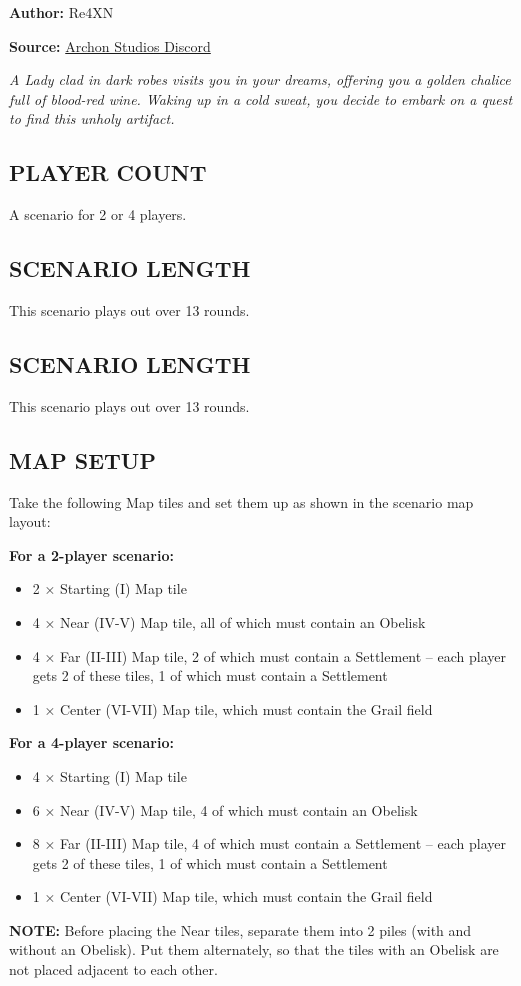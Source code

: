 
\begin{multicols*}{2}

\textbf{Author:} Re4XN

\textbf{Source:} \href{https://discord.com/channels/740870068178649108/1239631918643941509}{Archon Studios Discord}

\textit{A Lady clad in dark robes visits you in your dreams, offering you a golden chalice full of blood-red wine. Waking up in a cold sweat, you decide to embark on a quest to find this unholy artifact.}
\subsection*{\MakeUppercase{Player Count}}
A scenario for 2 or 4 players.
\subsection*{\MakeUppercase{Scenario Length}}
This scenario plays out over 13 rounds.
\subsection*{\MakeUppercase{Scenario Length}}
This scenario plays out over 13 rounds.
\subsection*{\MakeUppercase{Map Setup}}
Take the following Map tiles and set them up as shown in the scenario map layout:

\textbf{For a 2-player scenario:}
\begin{itemize}
    \item 2 × Starting (I) Map tile
    \item 4 × Near (IV-V) Map tile, all of which must contain an Obelisk
    \item 4 × Far (II-III) Map tile, 2 of which must contain a Settlement – each player gets 2 of these tiles, 1 of which must contain a Settlement
    \item 1 × Center (VI-VII) Map tile, which must contain the Grail field
\end{itemize}

\textbf{For a 4-player scenario:}
\begin{itemize}
    \item 4 × Starting (I) Map tile
    \item 6 × Near (IV-V) Map tile, 4 of which must contain an Obelisk
    \item 8 × Far (II-III) Map tile, 4 of which must contain a Settlement – each player gets 2 of these tiles, 1 of which must contain a Settlement
    \item 1 × Center (VI-VII) Map tile, which must contain the Grail field
\end{itemize}
\textbf{\MakeUppercase{Note:}} Before placing the Near tiles, separate them into 2 piles (with and without an Obelisk). Put them alternately, so that the tiles with an Obelisk are not placed adjacent to each other.

\end{multicols*}
